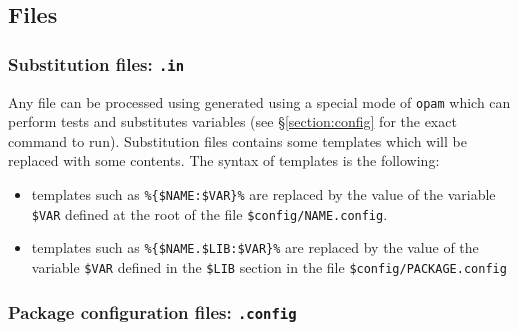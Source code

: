 \documentclass[a4paper,11pt]{article}
\begin{document}
\subsection{Files}

\subsubsection{Substitution files: {\tt *.in}}
\label{file:subst}

Any file can be processed using generated using a special mode of
{\tt opam} which can perform tests and substitutes variables (see
\S\ref{section:config} for the exact command to run). Substitution files
contains some templates which will be replaced with some contents. The
syntax of templates is the following:

\begin{itemize}

\item templates such as \verb+%{$NAME:$VAR}%+ are replaced by the value
  of the variable \verb+$VAR+ defined at the root of the file
  \verb+$config/NAME.config+.

\item templates such as \verb+%{$NAME.$LIB:$VAR}%+ are replaced by the
  value of the variable \verb+$VAR+ defined in the \verb+$LIB+ section
  in the file \verb+$config/PACKAGE.config+


\end{itemize}

\subsubsection{Package configuration files: {\tt *.config}}
\label{file:dotconfig}
\end{document}

